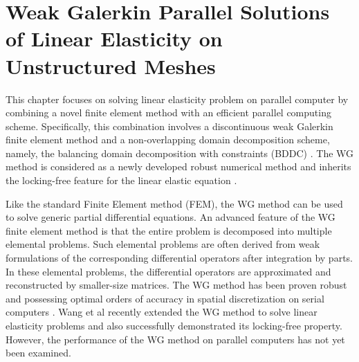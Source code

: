 \chapter{Weak Galerkin Parallel Solutions of Linear Elasticity on Unstructured Meshes}

This chapter focuses on solving linear elasticity problem on parallel computer by combining a novel finite element method with an efficient parallel computing scheme. Specifically, this combination involves a discontinuous weak Galerkin finite element method \cite{mu2012weak, li2013weak, wang2014weak, mu2013computational} and a non-overlapping domain decomposition scheme, namely, the balancing domain decomposition with constraints (BDDC) \cite{dohrmann2003preconditioner,tu2007three2d,tu2007three3d}. The WG method is considered as a newly developed robust numerical method and inherits the locking-free feature for the linear elastic equation \cite{wang2016locking}. 

Like the standard Finite Element method (FEM), the WG method can be used to solve generic partial differential equations. An advanced feature of the WG finite element method is that the entire problem is decomposed into multiple elemental problems. Such elemental problems are often derived from weak formulations of the corresponding differential operators after integration by parts. In these elemental problems, the differential operators are approximated and reconstructed by smaller-size matrices. The WG method has been proven robust and possessing optimal orders of accuracy in spatial discretization on serial computers \cite{mu2014weak, Mu2015new}. Wang et al \cite{wang2016locking} recently extended the WG method to solve linear elasticity problems and also successfully demonstrated its locking-free property. However, the performance of the WG method on parallel computers has not yet been examined.



